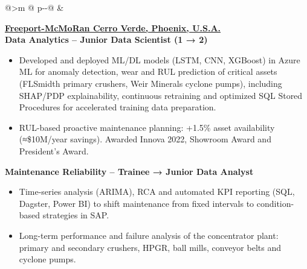 \begin{tabular}{@{}>{\raggedleft\arraybackslash}m{\datecol} @{\hspace{\colgap}} p{\dimexpr\textwidth-\datecol-\colgap\relax}@{}}
 &
\begin{minipage}[t]{\linewidth}\vspace{0pt}
\begin{expblock}
  \footnotesize
  \setlength{\parindent}{0pt}\setlength{\parskip}{0pt}
  \textbf{\href{https://www.fcx.com}{Freeport-McMoRan Cerro Verde, Phoenix, U.S.A.}}\\[-0.1em]
  \textbf{Data Analytics – Junior Data Scientist (1 → 2)}\\[-1em]
\begin{itemize}[nosep,leftmargin=1em]
  \item Developed and deployed ML/DL models (LSTM, CNN, XGBoost) in Azure ML for anomaly detection, wear and RUL prediction of critical assets (FLSmidth primary crushers, Weir Minerals cyclone pumps), including SHAP/PDP explainability, continuous retraining and optimized SQL Stored Procedures for accelerated training data preparation.
  \item RUL-based proactive maintenance planning: +1.5\% asset availability (≈\$10M/year savings). Awarded Innova 2022, Showroom Award and President’s Award.
\end{itemize}

  \textbf{Maintenance Reliability – Trainee → Junior Data Analyst}\\[-1em]
  \begin{itemize}[nosep,leftmargin=1em]
\item Time-series analysis (ARIMA), RCA and automated KPI reporting (SQL, Dagster, Power BI) to shift maintenance from fixed intervals to condition-based strategies in SAP.
\item Long-term performance and failure analysis of the concentrator plant: primary and secondary crushers, HPGR, ball mills, conveyor belts and cyclone pumps.
  \end{itemize}
\end{expblock}
\end{minipage}
\\[-0.2em]


\end{tabular}
